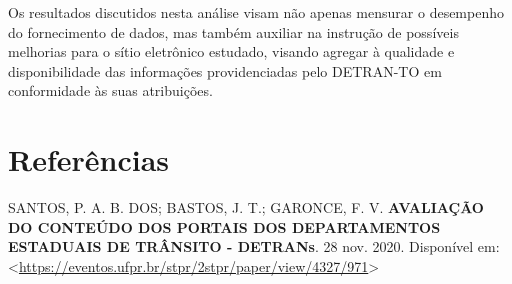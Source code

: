 \documentclass[
  a4paper,
]{article}
\newlength{\cslhangindent}
\newenvironment{CSLReferences}[2] %
 {\begin{list}{}{%
  \setlength{\itemindent}{0pt}
  \setlength{\leftmargin}{0pt}
  \setlength{\parsep}{0pt}
  \ifodd #1
   \setlength{\leftmargin}{\cslhangindent}
   \setlength{\itemindent}{-1\cslhangindent}
  \fi
  \setlength{\itemsep}{#2\baselineskip}}}
 {\end{list}}
\begin{document}
Os resultados discutidos nesta análise visam não apenas mensurar o
desempenho do fornecimento de dados, mas também auxiliar na instrução de
possíveis melhorias para o sítio eletrônico estudado, visando agregar à
qualidade e disponibilidade das informações providenciadas pelo
DETRAN-TO em conformidade às suas atribuições.

\section*{Referências}\label{referuxeancias}

\label{refs}
\begin{CSLReferences}{0}{1}
SANTOS, P. A. B. DOS; BASTOS, J. T.; GARONCE, F. V. \textbf{AVALIAÇÃO DO
CONTEÚDO DOS PORTAIS DOS DEPARTAMENTOS ESTADUAIS DE TRÂNSITO - DETRANs}.
28 nov. 2020. Disponível em:
\textless{}\url{https://eventos.ufpr.br/stpr/2stpr/paper/view/4327/971}\textgreater{}

\end{CSLReferences}
\end{document}
